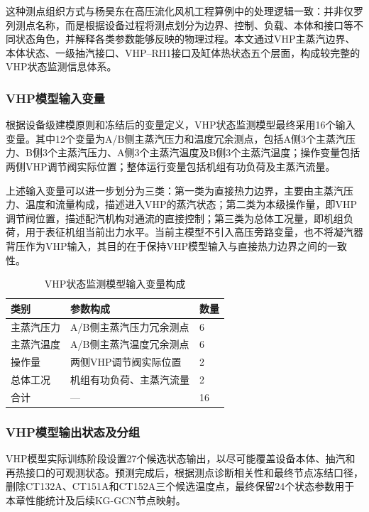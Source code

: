 这种测点组织方式与杨昊东在高压流化风机工程算例中的处理逻辑一致：并非仅罗列测点名称，而是根据设备过程将测点划分为边界、控制、负载、本体和接口等不同状态角色，并解释各类参数能够反映的物理过程。本文通过VHP主蒸汽边界、本体状态、一级抽汽接口、VHP--RH1接口及缸体热状态五个层面，构成较完整的VHP状态监测信息体系。

\subsubsection{VHP模型输入变量}

根据设备级建模原则和冻结后的变量定义，VHP状态监测模型最终采用16个输入变量。其中12个变量为A/B侧主蒸汽压力和温度冗余测点，包括A侧3个主蒸汽压力、B侧3个主蒸汽压力、A侧3个主蒸汽温度及B侧3个主蒸汽温度；操作变量包括两侧VHP调节阀实际位置；整体运行变量包括机组有功负荷及主蒸汽流量。

上述输入变量可以进一步划分为三类：第一类为直接热力边界，主要由主蒸汽压力、温度和流量构成，描述进入VHP的蒸汽状态；第二类为本级操作量，即VHP调节阀位置，描述配汽机构对通流的直接控制；第三类为总体工况量，即机组负荷，用于表征机组当前出力水平。当前主模型不引入高压旁路变量，也不将凝汽器背压作为VHP输入，其目的在于保持VHP模型输入与直接热力边界之间的一致性。

\begin{table}[htbp]
\centering
\caption{VHP状态监测模型输入变量构成}
\label{tab:vhp_inputs_v2}
\begin{tabular}{p{2.2cm}p{7.5cm}p{2.4cm}}
\toprule
类别 & 参数构成 & 数量\\
\midrule
主蒸汽压力 & A/B侧主蒸汽压力冗余测点 & 6\\
主蒸汽温度 & A/B侧主蒸汽温度冗余测点 & 6\\
操作量 & 两侧VHP调节阀实际位置 & 2\\
总体工况 & 机组有功负荷、主蒸汽流量 & 2\\
\midrule
合计 & --- & 16\\
\bottomrule
\end{tabular}
\end{table}

\subsubsection{VHP模型输出状态及分组}

VHP模型实际训练阶段设置27个候选状态输出，以尽可能覆盖设备本体、抽汽和再热接口的可观测状态。预测完成后，根据测点诊断相关性和最终节点冻结口径，删除CT132A、CT151A和CT152A三个候选温度点，最终保留24个状态参数用于本章性能统计及后续KG-GCN节点映射。

